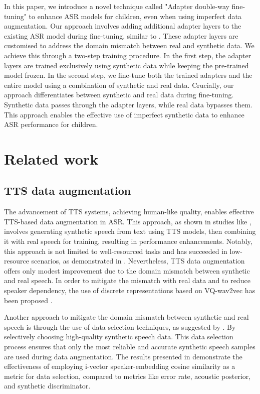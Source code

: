 In this paper, we introduce a novel technique called "Adapter double-way fine-tuning" to enhance ASR models for children, even when using imperfect data augmentation. Our approach involves adding additional adapter layers to the existing ASR model during fine-tuning, similar to \cite{fan2022draft}. These adapter layers are customised to address the domain mismatch between real and synthetic data. We achieve this through a two-step training procedure. In the first step, the adapter layers are trained exclusively using synthetic data while keeping the pre-trained model frozen. In the second step, we fine-tune both the trained adapters and the entire model using a combination of synthetic and real data. Crucially, our approach differentiates between synthetic and real data during fine-tuning. Synthetic data passes through the adapter layers, while real data bypasses them. This approach enables the effective use of imperfect synthetic data to enhance ASR performance for children.


\section{Related work}
\subsection{TTS data augmentation}
The advancement of TTS systems, achieving human-like quality, enables effective TTS-based data augmentation in ASR. This approach, as shown in studies like \cite{ laptev2020you}, involves generating synthetic speech from text using TTS models, then combining it with real speech for training, resulting in performance enhancements. Notably, this approach is not limited to well-resourced tasks and has succeeded in low-resource scenarios, as demonstrated in \cite{casanova2022asr}. Nevertheless, TTS data augmentation offers only modest improvement due to the domain mismatch between synthetic and real speech. 
In order to mitigate the mismatch with real data and to reduce speaker dependency,  the use of discrete representations based on VQ-wav2vec has been proposed \cite{9688218}.


Another approach to mitigate the domain mismatch between synthetic and real speech is through the use of data selection techniques, as suggested by \cite{wang2021towards}. By selectively choosing high-quality synthetic speech data. This data selection process ensures that only the most reliable and accurate synthetic speech samples are used during data augmentation. The results presented in \cite{wang2021towards} demonstrate the effectiveness of employing i-vector speaker-embedding cosine similarity as a metric for data selection, compared to metrics like error rate, acoustic posterior, and synthetic discriminator.

